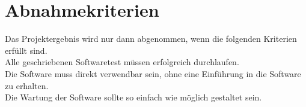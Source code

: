 \chapter{Abnahmekriterien}
Das Projektergebnis wird nur dann abgenommen, wenn die folgenden Kriterien erfüllt sind.\\
Alle geschriebenen Softwaretest müssen erfolgreich durchlaufen.\\
Die Software muss direkt verwendbar sein, ohne eine Einführung in die Software zu erhalten.\\
Die Wartung der Software sollte so einfach wie möglich gestaltet sein.\\

